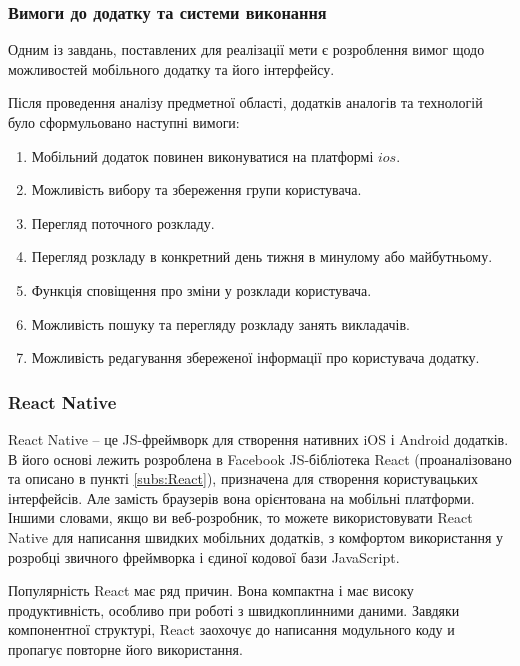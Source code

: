 \subsubsection{Вимоги до додатку та системи виконання}

Одним із завдань, поставлених для реалізації мети є розроблення вимог щодо можливостей мобільного додатку та його інтерфейсу.

Після проведення аналізу предметної області, додатків аналогів та технологій було сформульовано наступні вимоги:

\begin{enumerate}
    \item Мобільний додаток повинен виконуватися на платформі $ios$.
    \item Можливість вибору та збереження групи користувача.
    \item Перегляд поточного розкладу.
    \item Перегляд розкладу в конкретний день тижня в минулому або майбутньому. 
    \item Функція сповіщення про зміни у розклади користувача.
    \item Можливість пошуку та перегляду розкладу занять викладачів.
    \item Можливість редагування збереженої інформації про користувача додатку.
\end{enumerate}

\subsubsection{React Native}


React Native -- це JS-фреймворк для створення нативних iOS і Android додатків. В його основі лежить розроблена в Facebook JS-бібліотека React (проаналізовано та описано в пункті \ref{subs:React}), призначена для створення користувацьких інтерфейсів. Але замість браузерів вона орієнтована на мобільні платформи. Іншими словами, якщо ви веб-розробник, то можете використовувати React Native для написання  швидких мобільних додатків, з комфортом використання у розробці звичного фреймворка і єдиної кодової бази JavaScript.

Популярність React має ряд причин. Вона компактна і має високу продуктивність, особливо при роботі з швидкоплинними даними. Завдяки компонентної структурі, React заохочує до написання модульного коду и пропагує повторне його використання.

